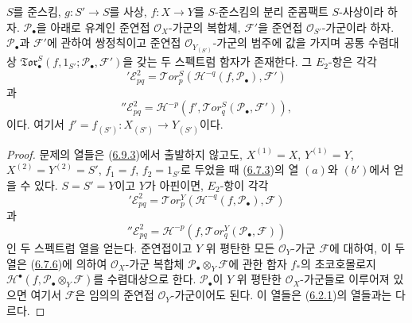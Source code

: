 \begin{proposition}[6.9.8]
\label{III.6.9.8-fr}
$S$를 준스킴, $g:S'\to S$를 사상,
$f:X\to Y$를 $S$-준스킴의 분리 준콤팩트 $S$-사상이라 하자.
$\mathscr P_\bullet$을 아래로 유계인 준연접 $\mathscr O_X$-가군의
복합체, $\mathscr F'$을 준연접 $\mathscr O_{S'}$-가군이라 하자.
$\mathscr P_\bullet$과 $\mathscr F'$에 관하여 쌍정칙이고 준연접
$\mathscr O_{Y_{(S')}}$-가군의 범주에 값을 가지며 공통 수렴대상
$\mathfrak{Tor}_\bullet^S(f,1_{S'};\mathscr P_\bullet,\mathscr F')$을
갖는 두 스펙트럼 함자가 존재한다. 그 $E_2$-항은 각각
\[
  {}'\mathscr E_{pq}^2
  =\mathscr{T}\!or_p^S
  (\mathscr H^{-q}(f,\mathscr P_\bullet),\mathscr F')
  \tag{6.9.8.1}\label{III.6.9.8.1.fr}
\]
과
\[
  {}''\mathscr E_{pq}^2
  =\mathscr H^{-p}
  (f',\mathscr{T}\!or_q^S(\mathscr P_\bullet,\mathscr F')),
  \tag{6.9.8.2}\label{III.6.9.8.2.fr}
\]
이다. 여기서 $f'=f_{(S')}:X_{(S')}\to Y_{(S')}$이다.
\end{proposition}

\begin{proof}
문제의 열들은 (\hyperref[III.6.9.3-fr]{6.9.3})에서 출발하지 않고도,
$X^{(1)}=X$, $Y^{(1)}=Y$, $X^{(2)}=Y^{(2)}=S'$, $f_1=f$,
$f_2=1_{S'}$로 두었을 때 (\hyperref[III.6.7.3-fr]{6.7.3})의 열
$(a)$와 $(b')$에서 얻을 수 있다. $S=S'=Y$이고 $Y$가 아핀이면,
$E_2$-항이 각각
\[
  {}'\mathscr E_{pq}^2
  =\mathscr{T}\!or_p^Y
  (\mathscr H^{-q}(f,\mathscr P_\bullet),\mathscr F)
  \tag{6.9.8.3}\label{III.6.9.8.3.fr}
\]
과
\[
  {}''\mathscr E_{pq}^2
  =\mathscr H^{-p}
  (f,\mathscr{T}\!or_q^Y(\mathscr P_\bullet,\mathscr F))
  \tag{6.9.8.4}\label{III.6.9.8.4.fr}
\]
인 두 스펙트럼 열을 얻는다. 준연접이고 $Y$ 위 평탄한 모든
$\mathscr O_Y$-가군 $\mathscr F$에 대하여, 이 두 열은
(\hyperref[III.6.7.6-fr]{6.7.6})에 의하여 $\mathscr O_X$-가군 복합체
$\mathscr P_\bullet\otimes_Y\mathscr F$에 관한 함자 $f_*$의
초코호몰로지
$\mathscr H^\bullet(f,\mathscr P_\bullet\otimes_Y\mathscr F)$를
수렴대상으로 한다. $\mathscr P_\bullet$이 $Y$ 위 평탄한
$\mathscr O_X$-가군들로 이루어져 있으면 여기서 $\mathscr F$은 임의의
준연접 $\mathscr O_Y$-가군이어도 된다. 이 열들은
(\hyperref[III.6.2.1-fr]{6.2.1})의 열들과는 다르다.
\end{proof}


